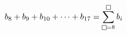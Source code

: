 $b_8+b_9+b_{10}+\cdots+b_{17}=\displaystyle\sum_{\text{\setlength{\fboxsep}{0.8pt}\framebox[5.6pt]{\rule{0pt}{3.2pt}}}=8}^{\text{\setlength{\fboxsep}{0.8pt}\framebox[5.6pt]{\rule{0pt}{3.2pt}}}} b_i$

